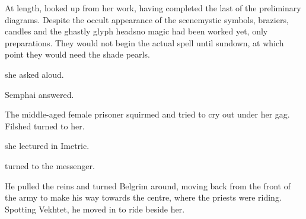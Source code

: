 At length, \Filshed{} looked up from her work, having completed the last of the preliminary diagrams. Despite the occult appearance of the scene\dash{}mystic symbols, braziers, candles and the ghastly glyph heads\dash{}no magic had been worked yet, only preparations. They would not begin the actual spell until sundown, at which point they would need the shade pearls. 

 she asked aloud. 

 Semphai answered. 

The middle-aged female prisoner squirmed and tried to cry out under her gag. Filshed turned to her.

 she lectured in Imetric. 







%
\ta{\Neftsaid!} 

\Narkiza{} turned to the messenger. 


 He pulled the reins and turned Belgrim around, moving back from the front of the army to make his way towards the centre, where the priests were riding. Spotting Vekhtet, he moved in to ride beside her. 





